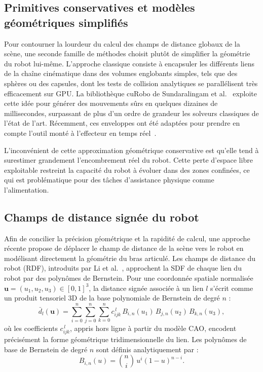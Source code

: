 \subsection{Primitives conservatives et modèles géométriques simplifiés}
Pour contourner la lourdeur du calcul des champs de distance globaux de la scène, une seconde famille de méthodes choisit plutôt de simplifier la géométrie du robot lui-même. L'approche classique consiste à encapsuler les différents liens de la chaîne cinématique dans des volumes englobants simples, tels que des sphères ou des capsules, dont les tests de collision analytiques se parallélisent très efficacement sur \ac{GPU}. La bibliothèque cuRobo de Sundaralingam et al.~\cite{Sundaralingam2023Curobo} exploite cette idée pour générer des mouvements sûrs en quelques dizaines de millisecondes, surpassant de plus d'un ordre de grandeur les solveurs classiques de l'état de l'art. Récemment, ces enveloppes ont été adaptées pour prendre en compte l'outil monté à l'effecteur en temps réel~\cite{Lee2025Fast}.

L'inconvénient de cette approximation géométrique conservative est qu'elle tend à surestimer grandement l'encombrement réel du robot. Cette perte d'espace libre exploitable restreint la capacité du robot à évoluer dans des zones confinées, ce qui est problématique pour des tâches d'assistance physique comme l'alimentation.

\subsection{Champs de distance signée du robot}
Afin de concilier la précision géométrique et la rapidité de calcul, une approche récente propose de déplacer le champ de distance de la scène vers le robot en modélisant directement la géométrie du bras articulé. Les champs de distance du robot (\ac{RDF}), introduits par Li et al.~\cite{Li2024rdf}, approchent la \ac{SDF} de chaque lien du robot par des polynômes de Bernstein. Pour une coordonnée spatiale normalisée $\mathbf{u} = (u_1, u_2, u_3) \in [0,1]^3$, la distance signée associée à un lien $l$ s'écrit comme un produit tensoriel 3D de la base polynomiale de Bernstein de degré $n$ :
\begin{equation}
\bar{d}_l(\mathbf{u})=\sum_{i=0}^n \sum_{j=0}^n \sum_{k=0}^n c^{\,l}_{ijk}\,B_{i,n}(u_1)\,B_{j,n}(u_2)\,B_{k,n}(u_3),
\end{equation}
où les coefficients $c^{\,l}_{ijk}$, appris hors ligne à partir du modèle \ac{CAO}, encodent précisément la forme géométrique tridimensionnelle du lien. Les polynômes de base de Bernstein de degré $n$ sont définis analytiquement par :
\begin{equation}
B_{i,n}(u)=\binom{n}{i}\,u^{i}(1-u)^{n-i}.
\end{equation}


